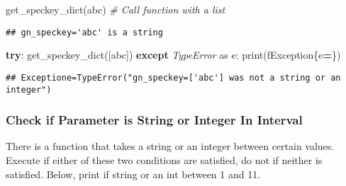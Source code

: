 \documentclass[
]{book}
\newenvironment{Shaded}{\begin{snugshade}}{\end{snugshade}}
\newcommand{\BuiltInTok}[1]{#1}
\newcommand{\CommentTok}[1]{\textcolor[rgb]{0.56,0.35,0.01}{\textit{#1}}}
\newcommand{\ControlFlowTok}[1]{\textcolor[rgb]{0.13,0.29,0.53}{\textbf{#1}}}
\newcommand{\ImportTok}[1]{#1}
\newcommand{\NormalTok}[1]{#1}
\newcommand{\OperatorTok}[1]{\textcolor[rgb]{0.81,0.36,0.00}{\textbf{#1}}}
\newcommand{\PreprocessorTok}[1]{\textcolor[rgb]{0.56,0.35,0.01}{\textit{#1}}}
\newcommand{\SpecialCharTok}[1]{\textcolor[rgb]{0.00,0.00,0.00}{#1}}
\newcommand{\SpecialStringTok}[1]{\textcolor[rgb]{0.31,0.60,0.02}{#1}}
\newcommand{\StringTok}[1]{\textcolor[rgb]{0.31,0.60,0.02}{#1}}
\begin{document}
\begin{Shaded}
\begin{Highlighting}[]
\NormalTok{get\_speckey\_dict(}\StringTok{\textquotesingle{}abc\textquotesingle{}}\NormalTok{)}
\CommentTok{\# Call function with a list}
\end{Highlighting}
\end{Shaded}

\begin{verbatim}
## gn_speckey='abc' is a string
\end{verbatim}

\begin{Shaded}
\begin{Highlighting}[]
\ControlFlowTok{try}\NormalTok{: }
\NormalTok{    get\_speckey\_dict([}\StringTok{\textquotesingle{}abc\textquotesingle{}}\NormalTok{])}
\ControlFlowTok{except} \PreprocessorTok{TypeError} \ImportTok{as}\NormalTok{ e: }
    \BuiltInTok{print}\NormalTok{(}\SpecialStringTok{f\textquotesingle{}Exception}\SpecialCharTok{\{e}\OperatorTok{=}\SpecialCharTok{\}}\SpecialStringTok{\textquotesingle{}}\NormalTok{)}
\end{Highlighting}
\end{Shaded}

\begin{verbatim}
## Exceptione=TypeError("gn_speckey=['abc'] was not a string or an integer")
\end{verbatim}

\hypertarget{check-if-parameter-is-string-or-integer-in-interval}{%
\subsubsection{Check if Parameter is String or Integer In Interval}\label{check-if-parameter-is-string-or-integer-in-interval}}

There is a function that takes a string or an integer between certain values. Execute if either of these two conditions are satisfied, do not if neither is satisfied. Below, print if string or an int between 1 and 11.
\end{document}
